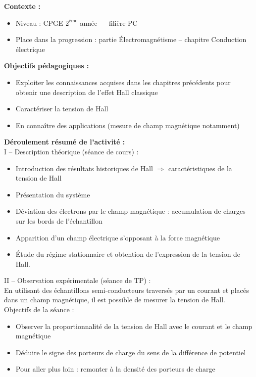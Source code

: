 \documentclass[a4paper,11pt]{article} %
\newenvironment{encart}[1]{%
	\begin{tcolorbox}
		[
		breakable, enhanced jigsaw, %
		arc = 1mm, %
		title = \textbf{#1}, %
		coltitle = white, %
		colbacktitle = blue, %
		colback = white, %
		colframe = blue %
		]
}{		
	\end{tcolorbox}
	\vspace*{0.35cm}
}
\begin{document}
	\begin{encart}{Activité pédagogique 1 : \'Etude de l'effet Hall classique}
		\textbf{Contexte :}
		\begin{itemize}
			\item Niveau : CPGE $ 2^\text{ème} $ année --- filière PC
			\item Place dans la progression : partie \'Electromagnétisme -- chapitre Conduction électrique
		\end{itemize}
		\vspace{0.5cm}
		
		\textbf{Objectifs pédagogiques :}
		\begin{itemize}
			\item Exploiter les connaissances acquises dans les chapitres précédents pour obtenir une description de l'effet Hall classique
			\item Caractériser la tension de Hall
			\item En connaître des applications (mesure de champ magnétique notamment)
		\end{itemize}
		\vspace{0.5cm}
		
		\textbf{Déroulement résumé de l'activité :}\\
		I -- Description théorique (séance de cours) :
		\begin{itemize}
			\item Introduction des résultats historiques de Hall $ \Rightarrow $ caractéristiques de la tension de Hall
			\item Présentation du système
			\item Déviation des électrons par le champ magnétique : accumulation de charges sur les bords de l'échantillon
			\item Apparition d'un champ électrique s'opposant à la force magnétique
			\item \'Etude du régime stationnaire et obtention de l'expression de la tension de Hall.
		\end{itemize}
		\vspace{0.5cm}
		
		II -- Observation expérimentale (séance de TP) :\\
		En utilisant des échantillons semi-conducteurs traversés par un courant et placés dans un champ magnétique, il est possible de mesurer la tension de Hall.\\
		Objectifs de la séance :
		\begin{itemize}
			\item Observer la proportionnalité de la tension de Hall avec le courant et le champ magnétique
			\item Déduire le signe des porteurs de charge du sens de la différence de potentiel
			\item Pour aller plus loin : remonter à la densité des porteurs de charge
		\end{itemize}
		

\end{encart}
\end{document}
